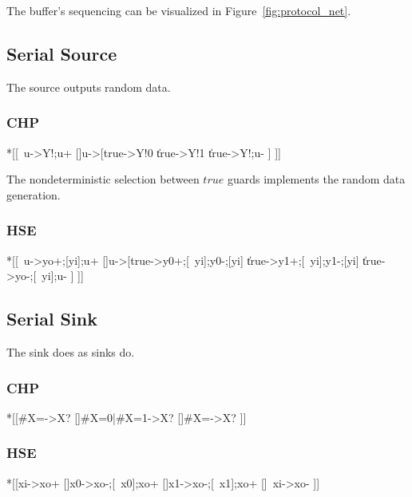 \documentclass{article}
\begin{document}
\noindent
The buffer's sequencing can be visualized in Figure~\ref{fig:protocol_net}.

\subsection{Serial Source}

The source outputs random data.

\subsubsection*{CHP}

\begin{csp}
*[[~u->Y!\neg\emptyset;u+
  []u->[true->Y!0
         \|true->Y!1
         \|true->Y!\emptyset;u-
         ]
 ]]
\end{csp}

\noindent
The nondeterministic selection between $true$ guards implements the random
data generation.

\subsubsection*{HSE}

\begin{hse}
*[[~u->yo+;[yi];u+
  []u->[true->y0+;[~yi];y0-;[yi]
         \|true->y1+;[~yi];y1-;[yi]
         \|true->yo-;[~yi];u-
         ]
 ]]
\end{hse}

\subsection{Serial Sink}

The sink does as sinks do.

\subsubsection*{CHP}

\begin{csp}
*[[#{X=\neg\emptyset}->X?
  []#{X=0}|#{X=1}->X?
  []#{X=\emptyset}->X?
 ]]
\end{csp}

\subsubsection*{HSE}

\begin{hse}
*[[xi->xo+
  []x0->xo-;[~x0];xo+
  []x1->xo-;[~x1];xo+
  []~xi->xo-
 ]]
\end{hse}
\end{document}
